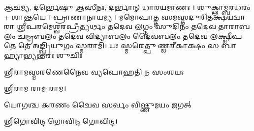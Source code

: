 


𑌆𑌚𑌮𑍍𑌯, 𑌦𑌰𑍍𑌭𑍇𑌷𑍁 𑌆𑌸𑍀𑌨𑌃, 𑌦𑌰𑍍𑌭𑌾𑌨𑍍 𑌧𑌾𑌰𑌯𑌮𑌾𑌣𑌃 । 𑌶𑍁𑌕𑍍𑌲𑌾𑌮𑍍𑌬𑌰𑌧𑌰𑌂 + 𑌶𑌾𑌨𑍍𑌤𑌯𑍇 । 𑌪𑍍𑌰𑌾𑌣𑌾𑌨𑌾𑌯𑌮𑍍𑌯 । 
    𑌮𑌮𑍋𑌪𑌾𑌤𑍍𑌤 𑌸𑌮𑌸𑍍𑌤𑌦𑍁𑌰𑌿𑌤𑌕𑍍𑌷𑌯𑌦𑍍𑌵𑌾𑌰𑌾 𑌶𑍍𑌰𑍀𑌪𑌰𑌮𑍇𑌶𑍍𑌵𑌰𑌪𑍍𑌰𑍀𑌤𑍍𑌯𑌰𑍍𑌥𑌂   𑌤𑌦𑍇𑌵 𑌲𑌗𑍍𑌨𑌂 𑌸𑍁𑌦𑌿𑌨𑌂 𑌤𑌦𑍇𑌵 𑌤𑌾𑌰𑌾𑌬𑌲𑌂 𑌚𑌨𑍍𑌦𑍍𑌰𑌬𑌲𑌂 𑌤𑌦𑍇𑌵 𑌵𑌿𑌦𑍍𑌯𑌾𑌬𑌲𑌂 𑌦𑍈𑌵𑌬𑌲𑌂 𑌤𑌦𑍇𑌵 𑌲𑌕𑍍𑌷𑍍𑌮𑍀𑌪𑌤𑍇 𑌤𑍇 𑌅𑌙𑍍𑌘𑍍𑌰𑌿𑌯𑍁𑌗𑌂 𑌸𑍍𑌮𑌰𑌾𑌮𑌿।
    {𑌯𑌃 𑌸𑍍𑌮𑌰𑍇𑌤𑍍𑌪𑍁𑌣𑍍𑌡𑌰𑍀𑌕𑌾𑌕𑍍𑌷𑌂 𑌸 𑌬𑌾𑌹𑍍𑌯𑌾𑌭𑍍𑌯𑌨𑍍𑌤𑌰𑌃 𑌶𑍁𑌚𑌿𑌃}

{𑌶𑍍𑌰𑍀𑌰𑌾𑌮𑌸𑍍𑌮𑌰𑌣𑍇𑌨𑍈𑌵 𑌵𑍍𑌯𑌪𑍋𑌹𑌤𑌿 𑌨 𑌸𑌂𑌶𑌯𑌃 }

𑌶𑍍𑌰𑍀𑌰𑌾𑌮 𑌰𑌾𑌮 𑌰𑌾𑌮। 

{𑌯𑍋𑌗𑌶𑍍𑌚 𑌕𑌰𑌣𑌂 𑌚𑍈𑌵 𑌸𑌰𑍍𑌵𑌂 𑌵𑌿𑌷𑍍𑌣𑍁𑌮𑌯𑌂 𑌜𑌗𑌤𑍍}

𑌶𑍍𑌰𑍀𑌗𑍋𑌵𑌿𑌨𑍍𑌦 𑌗𑍋𑌵𑌿𑌨𑍍𑌦 𑌗𑍋𑌵𑌿𑌨𑍍𑌦। 

